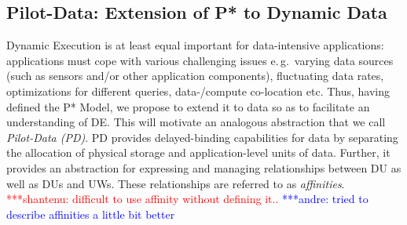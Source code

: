 \documentclass[conference,final]{IEEEtran}
\newcommand{\jhanote}[1]{ {\textcolor{red} { ***shantenu: #1 }}}
\newcommand{\alnote}[1]{ {\textcolor{blue} { ***andre: #1 }}}
\newcommand{\alnote}[1]{}
\newcommand{\jhanote}[1]{}
\newcommand{\upp}{\vspace*{-0.5em}}
\begin{document}
\subsection{Pilot-Data: Extension of P* to Dynamic Data\upp\upp}
\label{sec:pilot-data}








Dynamic Execution is at least equal important for data-intensive applications:
applications must cope with various challenging issues e.\,g.\ varying data
sources (such as sensors and/or other application components), fluctuating data
rates, optimizations for different queries, data-/compute co-location etc. Thus,
having defined the P* Model, we propose to extend it to data so as to facilitate
an understanding of DE. This will motivate an analogous abstraction that we call
\emph{Pilot-Data (PD)}. PD provides delayed-binding capabilities for data by
separating the allocation of physical storage and application-level units of
data. Further, it provides an abstraction for expressing and managing
relationships between DU as well as DUs and UWs. These relationships are
referred to as
\emph{affinities}.
\jhanote{difficult to use affinity
  without defining it..}
\alnote{tried to describe affinities a little bit better}
\end{document}
